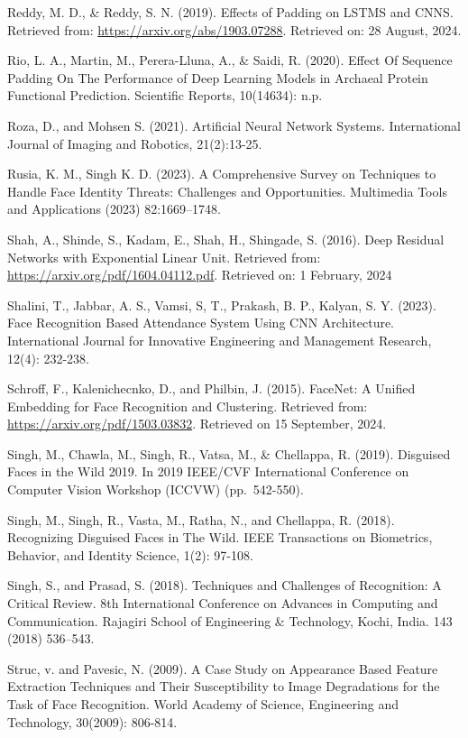 \documentclass[
  12pt,
]{report}
\begin{document}
Reddy, M. D., \& Reddy, S. N. (2019). Effects of Padding on LSTMS and
CNNS. Retrieved \hangindent=40pt from:
\url{https://arxiv.org/abs/1903.07288}. Retrieved on: 28 August, 2024.

Rio, L. A., Martin, M., Perera-Lluna, A., \& Saidi, R. (2020). Effect Of
Sequence \hangindent=40pt Padding On The Performance of Deep Learning
Models in Archaeal Protein Functional Prediction. Scientific Reports,
10(14634): n.p.

Roza, D., and Mohsen S. (2021). Artificial Neural Network Systems.
International \hangindent=40pt Journal of Imaging and Robotics,
21(2):13-25.

Rusia, K. M., Singh K. D. (2023). A Comprehensive Survey on Techniques
to Handle \hangindent=40pt Face Identity Threats: Challenges and
Opportunities. Multimedia Tools and Applications (2023) 82:1669--1748.

Shah, A., Shinde, S., Kadam, E., Shah, H., Shingade, S. (2016). Deep
Residual \hangindent=40pt Networks with Exponential Linear Unit.
Retrieved from: \url{https://arxiv.org/pdf/1604.04112.pdf}. Retrieved
on: 1 February, 2024

Shalini, T., Jabbar, A. S., Vamsi, S, T., Prakash, B. P., Kalyan, S. Y.
(2023). \hangindent=40pt Face Recognition Based Attendance System Using
CNN Architecture. International Journal for Innovative Engineering and
Management Research, 12(4): 232-238.

Schroff, F., Kalenichecnko, D., and Philbin, J. (2015). FaceNet: A
Unified \hangindent=40pt Embedding for Face Recognition and Clustering.
Retrieved from: \url{https://arxiv.org/pdf/1503.03832}. Retrieved on 15
September, 2024.

Singh, M., Chawla, M., Singh, R., Vatsa, M., \& Chellappa, R. (2019).
Disguised \hangindent=40pt Faces in the Wild 2019. In 2019 IEEE/CVF
International Conference on Computer Vision Workshop (ICCVW)
(pp.~542-550).

Singh, M., Singh, R., Vasta, M., Ratha, N., and Chellappa, R. (2018).
Recognizing \hangindent=40pt Disguised Faces in The Wild. IEEE
Transactions on Biometrics, Behavior, and Identity Science, 1(2):
97-108.

Singh, S., and Prasad, S. (2018). Techniques and Challenges of
Recognition: A \hangindent=40pt Critical Review. 8th International
Conference on Advances in Computing and Communication. Rajagiri School
of Engineering \& Technology, Kochi, India. 143 (2018) 536--543.

Struc, v. and Pavesic, N. (2009). A Case Study on Appearance Based
Feature \hangindent=40pt Extraction Techniques and Their Susceptibility
to Image Degradations for the Task of Face Recognition. World Academy of
Science, Engineering and Technology, 30(2009): 806-814.
\end{document}

